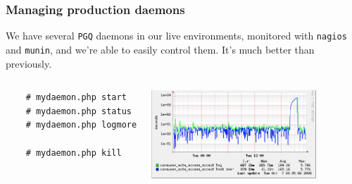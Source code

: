 \documentclass{beamer}
\begin{document}
\begin{frame}[fragile]
  \frametitle{Managing production daemons}

  We have several \texttt{PGQ} daemons in our live environments, monitored
  with \texttt{nagios} and \texttt{munin}, and we're able to easily control
  them. It's much better than previously.

\begin{columns}[c]
  \begin{example}
  \begin{verbatim}
    # mydaemon.php start
    # mydaemon.php status
    # mydaemon.php logmore

    # mydaemon.php kill
  \end{verbatim}
  \end{example}
\begin{center} 
\includegraphics[height=1.3in]{pgq.png}
\end{center} 
\end{columns}
\end{frame}
\end{document}
